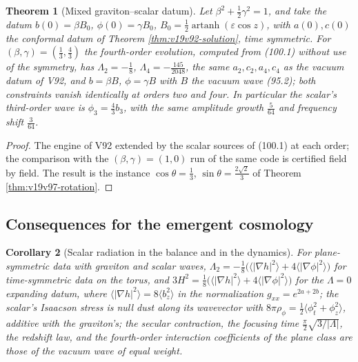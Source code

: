 \documentclass[11pt]{article}
\newtheorem{theorem}{Theorem}[section]
\newtheorem{corollary}[theorem]{Corollary}
\theoremstyle{remark}
\begin{document}
\begin{theorem}[Mixed graviton--scalar datum]
\label{thm:v19v97-mixed}
Let \(\beta^2+\tfrac12\gamma^2=1\), and take the datum
\(b(0)=\beta B_0\), \(\phi(0)=\gamma B_0\), \(B_0=\tfrac12\operatorname{artanh}(\varepsilon\cos z)\),
with \(a(0),c(0)\) the conformal datum of Theorem
\ref{thm:v19v92-solution}, time symmetric.  For \((\beta,\gamma)=(\tfrac13,\tfrac43)\)
the fourth-order evolution, computed from (100.1) without use of the
symmetry, has \(\Lambda_2=-\tfrac18\), \(\Lambda_4=-\tfrac{145}{2048}\),
the same \(a_2,c_2,a_4,c_4\) as the vacuum datum of V92, and
\(b=\beta B\), \(\phi=\gamma B\) with \(B\) the vacuum wave (95.2); both
constraints vanish identically at orders two and four.  In
particular the scalar's third-order wave is
\(\phi_3=\tfrac43b_3\), with the same amplitude growth \(\tfrac5{64}\)
and frequency shift \(\tfrac3{64}\).
\end{theorem}

\begin{proof}
The engine of V92 extended by the scalar sources of (100.1) at
each order; the comparison with the \((\beta,\gamma)=(1,0)\) run of the
same code is certified field by field.  The result is the instance
\(\cos\theta=\tfrac13\), \(\sin\theta=\tfrac{2\sqrt2}3\) of Theorem
\ref{thm:v19v97-rotation}.
\end{proof}

\subsection{Consequences for the emergent cosmology}

\begin{corollary}[Scalar radiation in the balance and in the dynamics]
\label{cor:v19v97-transfer}
For plane-symmetric data with graviton and scalar waves,
\(\Lambda_2=-\tfrac18\bigl(\langle|\nabla h|^2\rangle+4\langle|\nabla\phi|^2\rangle\bigr)\)
for time-symmetric data on the torus, and
\(3H^2=\tfrac18\bigl(\langle|\nabla h|^2\rangle+4\langle|\nabla\phi|^2\rangle\bigr)\)
for the \(\Lambda=0\) expanding datum, where
\(\langle|\nabla h|^2\rangle=8\langle b_z^2\rangle\) in the normalization
\(g_{xx}=e^{2a+2b}\); the scalar's Isaacson stress
is null dust along its wavevector with \(8\pi\rho_\phi=\tfrac12\langle\phi_t^2+\phi_z^2\rangle\),
additive with the graviton's; the secular contraction, the focusing
time \(\tfrac\pi2\sqrt{3/|\Lambda|}\), the redshift law, and the
fourth-order interaction coefficients of the plane class are those
of the vacuum wave of equal weight.
\end{corollary}
\end{document}
